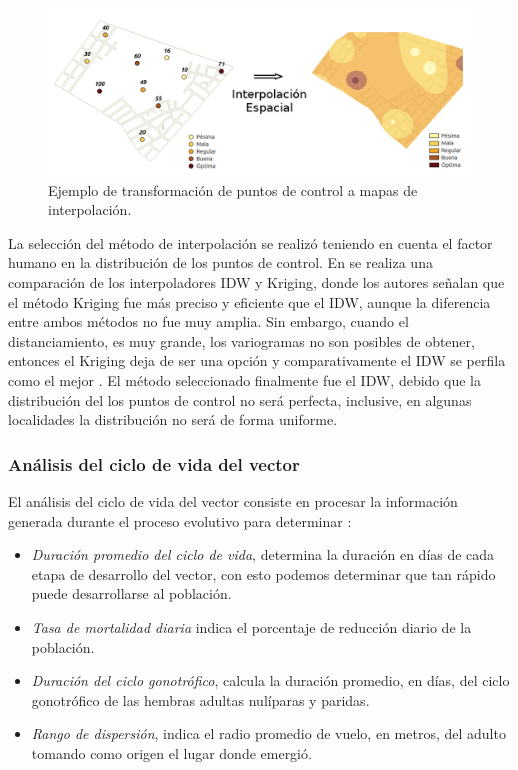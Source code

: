 \begin{figure}[!htpb]
\centering
\includegraphics[width=1\textwidth]{capitulo-5/graphics/identificacion-focos.png}
\caption{\label{fig:cap-5-identificacon-focos}Ejemplo de transformación de puntos de control a mapas de interpolación.}
\end{figure}

La selección del método de interpolación se realizó teniendo en cuenta el factor humano en la
distribución de los puntos de control. En \cite{villatoro2007comparacion} se realiza una
comparación de los interpoladores IDW y Kriging, donde los autores señalan que el método Kriging
fue más preciso y eficiente que el IDW, aunque la diferencia entre ambos métodos no fue muy amplia.
Sin embargo, cuando el distanciamiento, es muy grande, los variogramas no son posibles de obtener,
entonces el Kriging deja de ser una opción y comparativamente el IDW se perfila como el mejor
\cite{villatoro2007comparacion}. El método seleccionado finalmente fue el IDW, debido que la
distribución del los puntos de control no será perfecta, inclusive, en algunas localidades la
distribución no será de forma uniforme.

\subsubsection{Análisis del ciclo de vida del vector}
El análisis del ciclo de vida del vector consiste en procesar la información generada durante el
proceso evolutivo para determinar :

\begin{itemize}
    \item \textit{Duración promedio del ciclo de vida}, determina la duración en días de cada etapa de desarrollo del vector, con esto podemos determinar que tan rápido puede desarrollarse al población.

    \item \textit{Tasa de mortalidad diaria} indica el porcentaje de reducción diario de la población.

    \item \textit{Duración del ciclo gonotrófico}, calcula la duración promedio, en días, del ciclo gonotrófico de las hembras adultas nulíparas y paridas.

    \item \textit{Rango de dispersión}, indica el radio promedio de vuelo, en metros, del adulto tomando como origen el lugar donde emergió.

\end{itemize}
